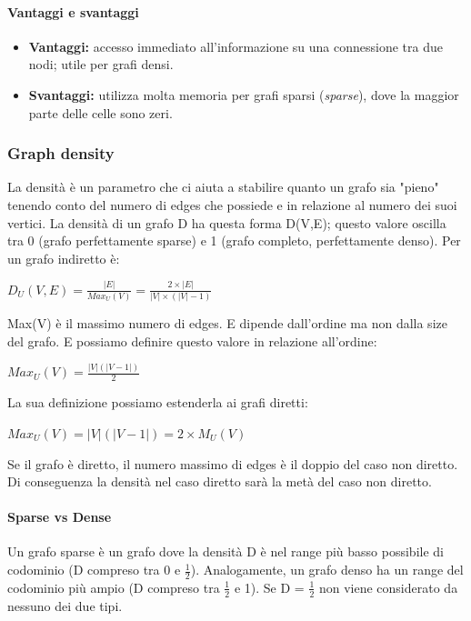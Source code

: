 \paragraph{Vantaggi e svantaggi}

\begin{itemize}
    \item \textbf{Vantaggi:} accesso immediato all'informazione su una connessione tra due nodi; utile per grafi densi.
    \item \textbf{Svantaggi:} utilizza molta memoria per grafi sparsi (\emph{sparse}), dove la maggior parte delle celle sono zeri.
\end{itemize}

\subsubsection*{Graph density}
La densità è un parametro che ci aiuta a stabilire quanto un grafo sia "pieno" tenendo conto del numero di edges che possiede e in relazione al numero dei suoi vertici. La densità di un grafo D ha questa forma D(V,E); questo valore oscilla tra 0 (grafo perfettamente sparse) e 1 (grafo completo, perfettamente denso). Per un grafo indiretto è:
\begin{center}
        \begin{math}
            D_U(V,E) = \frac{|E|}{Max_U(V)} = \frac{2 \times |E|}{|V| \times (|V| - 1)}
        \end{math}
\end{center}
Max(V) è il massimo numero di edges. E dipende dall'ordine ma non dalla size del grafo. E possiamo definire questo valore in relazione all'ordine: 
\begin{center}
        \begin{math}
            Max_U(V) = \frac{|V| (|V - 1|)}{2}
        \end{math}
\end{center}
La sua definizione possiamo estenderla ai grafi diretti:
\begin{center}
        \begin{math}
            Max_U(V) = |V| (|V - 1|) = 2 \times M_U(V)
        \end{math}
\end{center}
Se il grafo è diretto, il numero massimo di edges è il doppio del caso non diretto. Di conseguenza la densità nel caso diretto sarà la metà del caso non diretto. 
\paragraph*{Sparse vs Dense}
Un grafo sparse è un grafo dove la densità D è nel range più basso possibile di codominio (D compreso tra 0 e $\frac{1}{2}$). Analogamente, un grafo denso ha un range del codominio più ampio (D compreso tra $\frac{1}{2}$ e 1). Se D = $\frac{1}{2}$ non viene considerato da nessuno dei due tipi.  
